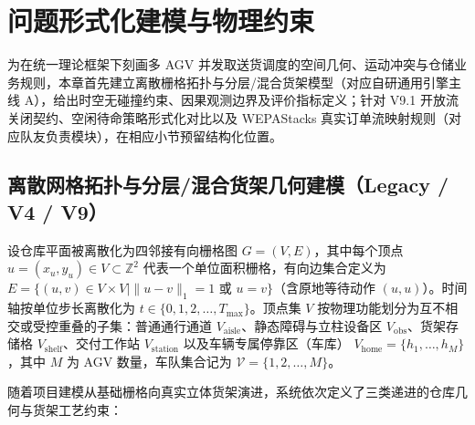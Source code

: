 \section{问题形式化建模与物理约束}
\label{sec:modeling}

为在统一理论框架下刻画多 AGV 并发取送货调度的空间几何、运动冲突与仓储业务规则，本章首先建立离散栅格拓扑与分层/混合货架模型（对应自研通用引擎主线 A），给出时空无碰撞约束、因果观测边界及评价指标定义；针对 V9.1 开放流关闭契约、空闲待命策略形式化对比以及 WEPAStacks 真实订单流映射规则（对应队友负责模块），在相应小节预留结构化位置。

\subsection{离散网格拓扑与分层/混合货架几何建模（Legacy / V4 / V9）}

设仓库平面被离散化为四邻接有向栅格图 $G = (V, E)$，其中每个顶点 $u = (x_u, y_u) \in V \subset \mathbb{Z}^2$ 代表一个单位面积栅格，有向边集合定义为 $E = \{(u, v) \in V \times V \mid \|u - v\|_1 = 1 \text{ 或 } u = v\}$（含原地等待动作 $(u, u)$）。时间轴按单位步长离散化为 $t \in \{0, 1, 2, \dots, T_{\max}\}$。顶点集 $V$ 按物理功能划分为互不相交或受控重叠的子集：普通通行通道 $V_{\text{aisle}}$、静态障碍与立柱设备区 $V_{\text{obs}}$、货架存储格 $V_{\text{shelf}}$、交付工作站 $V_{\text{station}}$ 以及车辆专属停靠区（车库） $V_{\text{home}} = \{h_1, \dots, h_M\}$，其中 $M$ 为 AGV 数量，车队集合记为 $\mathcal{V} = \{1, 2, \dots, M\}$。

随着项目建模从基础栅格向真实立体货架演进，系统依次定义了三类递进的仓库几何与货架工艺约束：

